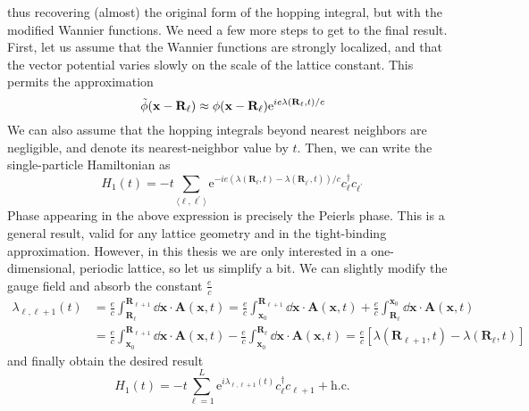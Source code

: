 thus recovering (almost) the original form of the hopping integral, but with the modified Wannier functions.
We need a few more steps to get to the final result. First, let us assume that the Wannier functions
are strongly localized, and that the vector potential varies slowly on the scale of the lattice constant.
This permits the approximation
\begin{equation}
    \Tilde{\phi}(\mathbf{x - \mathbf{R}_{\ell}}) \approx \phi(\mathbf{x - \mathbf{R}_{\ell}}) \mathrm{e}^{i e \lambda(\mathbf{R}_{\ell} ,t) / c}
\end{equation}
We can also assume that the hopping integrals beyond nearest neighbors are negligible, and denote
its nearest-neighbor value by \(t\). Then, we can write the single-particle Hamiltonian as
\begin{equation}
    H_1(t) = -t \sum_{\langle \ell,\ell^{\prime} \rangle } \mathrm{e}^{-i e \left( \lambda(\mathbf{R}_{\ell},t) -
    \lambda (\mathbf{R}_{\ell^{\prime}},t) \right) /c } c^{\dag}_{\ell}c_{\ell^{\prime}}
\end{equation}
Phase appearing in the above expression is precisely the Peierls phase. This is a general result, valid for
any lattice geometry and in the tight-binding approximation. However, in this thesis we are only interested in a
one-dimensional, periodic lattice, so let us simplify a bit. We can slightly modify the gauge field
and absorb the constant \(\frac{e}{c}\)
\begin{align}
    \lambda_{\ell,\ell+1}(t) & = \frac{e}{c} \int_{\mathbf{R}_{\ell}}^{\mathbf{R}_{\ell+1}} \dd{\mathbf{x}} \cdot \mathbf{A}(\mathbf{x},t)
    = \frac{e}{c} \int_{\mathbf{x}_0}^{\mathbf{R}_{\ell+1}} \dd{\mathbf{x}} \cdot \mathbf{A}(\mathbf{x},t) + \frac{e}{c} \int_{\mathbf{R}_{\ell}}^{\mathbf{x}_0} \dd{\mathbf{x}} \cdot \mathbf{A}(\mathbf{x},t) \nonumber               \\
                             & = \frac{e}{c} \int^{\mathbf{R}_{\ell+1}}_{\mathbf{x}_0} \dd{\mathbf{x}}\cdot \mathbf{A}(\mathbf{x},t)- \frac{e}{c} \int_{\mathbf{x}_0}^{\mathbf{R}_{\ell}} \dd{\mathbf{x}}\cdot \mathbf{A}(\mathbf{x},t)
    = \frac{e}{c}\left[ \lambda(\mathbf{R}_{\ell+1},t) - \lambda(\mathbf{R}_{\ell},t) \right]
    \label{eq:peierls_phase}
\end{align}
and finally obtain the desired result
\begin{equation}
    H_1(t) = -t \sum_{ \ell=1}^{L} \mathrm{e}^{i \lambda_{\ell,\ell+1}(t) } c^{\dag}_{\ell}c_{\ell+1} + \mathrm{h.c.}
    \label{eq:peierls_hamiltonian}
\end{equation}

